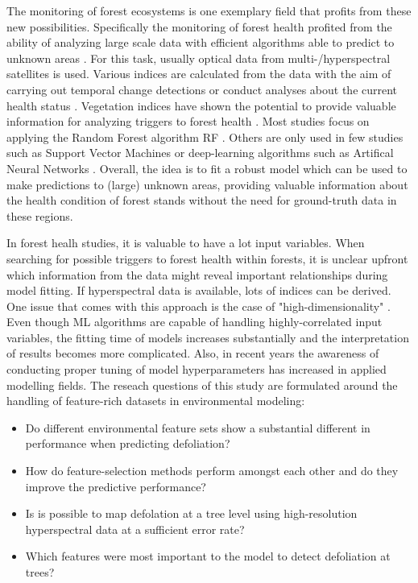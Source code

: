 \documentclass[review]{elsarticle}
\begin{document}
The monitoring of forest ecosystems is one exemplary field that profits from these new possibilities.
Specifically the monitoring of forest health profited from the ability of analyzing large scale data with efficient algorithms able to predict to unknown areas \citep{hawrylo2018, mascaro2014}.
For this task, usually optical data from multi-/hyperspectral satellites is used.
Various indices are calculated from the data with the aim of carrying out temporal change detections \citep{zhang2016} or conduct analyses about the current health status \citep{townsend2012}.
Vegetation indices have shown the potential to provide valuable information for analyzing triggers to forest health \citep{jiang2014, adamczyk2015}.
Most studies focus on applying the Random Forest algorithm \ac{RF} \citep{belgiu2016, lary2016, michez2016}.
Others are only used in few studies such as Support Vector Machines \citep{clark2018} or deep-learning algorithms such as Artifical Neural Networks \citep{ingram2005, rocha2018}.
Overall, the idea is to fit a robust model which can be used to make predictions to (large) unknown areas, providing valuable information about the health condition of forest stands without the need for ground-truth data in these regions.

In forest healh studies, it is valuable to have a lot input variables.
When searching for possible triggers to forest health within forests, it is unclear upfront which information from the data might reveal important relationships during model fitting.
If hyperspectral data is available, lots of indices can be derived.
One issue that comes with this approach is the case of "high-dimensionality" \citep{trunk1979, xu2016}.
Even though \ac{ML} algorithms are capable of handling highly-correlated input variables, the fitting time of models increases substantially and the interpretation of results becomes more complicated.
Also, in recent years the awareness of conducting proper tuning of model hyperparameters has increased in applied modelling fields.
The reseach questions of this study are formulated around the handling of feature-rich datasets in environmental modeling:

\begin{itemize}
	\item Do different environmental feature sets show a substantial different in performance when predicting defoliation?
    \item How do feature-selection methods perform amongst each other and do they improve the predictive performance?
    \item Is is possible to map defolation at a tree level using high-resolution hyperspectral data at a sufficient error rate?
    \item Which features were most important to the model to detect defoliation at trees?\end{itemize}
\end{document}
